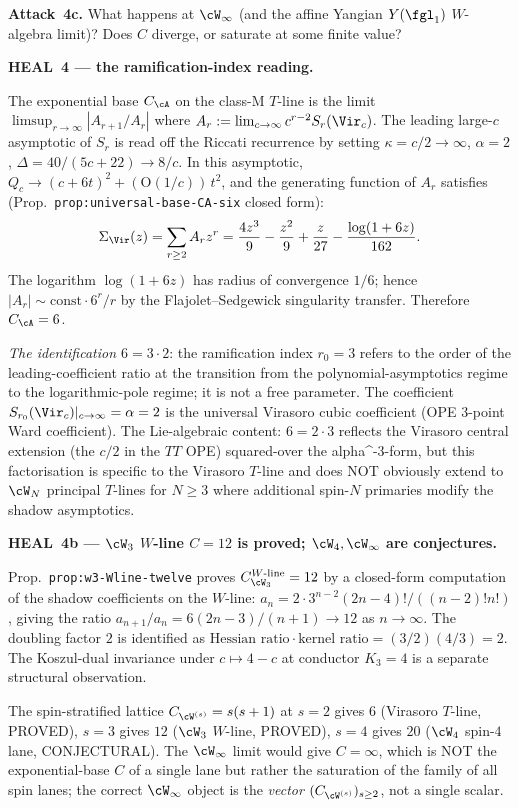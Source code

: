 \textbf{Attack~4c.} What happens at $\cW_\infty$ (and the affine Yangian
$Y(\fgl_1)$ $W$-algebra limit)? Does $C$ diverge, or saturate at some
finite value?

\textbf{HEAL~4 --- the ramification-index reading.}

The exponential base $C_\cA$ on the class-M $T$-line is the limit
$\limsup_{r \to\infty} |A_{r+1}/A_r|$ where
$A_r := \lim_{c \to\infty} c^{r-2} S_r(\Vir_c)$. The leading large-$c$
asymptotic of $S_r$ is read off the Riccati recurrence by setting
$\kappa = c/2 \to \infty$, $\alpha = 2$, $\Delta = 40/(5c+22) \to 8/c$. In
this asymptotic, $Q_c \to (c + 6t)^2 + (\text{O}(1/c))\,t^2$, and the
generating function of $A_r$ satisfies (Prop.~\texttt{prop:universal-base-CA-six}
closed form):
\[
  \Sigma_\Vir(z) = \sum_{r \ge 2} A_r z^r
  = \frac{4z^3}{9} - \frac{z^2}{9} + \frac{z}{27} - \frac{\log(1+6z)}{162}.
\]
The logarithm $\log(1 + 6z)$ has radius of convergence $1/6$; hence
$|A_r| \sim \text{const} \cdot 6^r/r$ by the Flajolet--Sedgewick
singularity transfer. Therefore $C_\cA = 6$.

\emph{The identification $6 = 3 \cdot 2$}: the ramification index $r_0 = 3$
refers to the order of the leading-coefficient ratio at the transition
from the polynomial-asymptotics regime to the logarithmic-pole regime; it
is not a free parameter. The coefficient $S_{r_0}(\Vir_c)|_{c \to\infty}
= \alpha = 2$ is the universal Virasoro cubic coefficient (OPE $3$-point
Ward coefficient). The Lie-algebraic content: $6 = 2 \cdot 3$ reflects the
Virasoro central extension (the $c/2$ in the $TT$ OPE) squared-over the
alpha\^{}-3-form, but this factorisation is specific to the Virasoro
$T$-line and does NOT obviously extend to $\cW_N$ principal $T$-lines for
$N \ge 3$ where additional spin-$N$ primaries modify the shadow asymptotics.

\textbf{HEAL~4b --- $\cW_3$ $W$-line $C = 12$ is proved;
$\cW_4, \cW_\infty$ are conjectures.}

Prop.~\texttt{prop:w3-Wline-twelve} proves $C^{W\text{-line}}_{\cW_3} = 12$
by a closed-form computation of the shadow coefficients on the $W$-line:
$a_n = 2 \cdot 3^{n-2} (2n-4)! / ((n-2)! n!)$, giving the ratio
$a_{n+1}/a_n = 6(2n-3)/(n+1) \to 12$ as $n \to \infty$. The doubling factor
$2$ is identified as $\text{Hessian ratio} \cdot \text{kernel ratio} = (3/2)(4/3) = 2$.
The Koszul-dual invariance under $c \mapsto 4-c$ at conductor $K_3 = 4$ is a
separate structural observation.

The spin-stratified lattice $C_{\cW^{(s)}} = s(s+1)$ at $s = 2$ gives $6$
(Virasoro $T$-line, PROVED), $s = 3$ gives $12$ ($\cW_3$ $W$-line, PROVED),
$s = 4$ gives $20$ ($\cW_4$ spin-$4$ lane, CONJECTURAL). The $\cW_\infty$
limit would give $C = \infty$, which is NOT the
exponential-base $C$ of a single lane but rather the saturation of
the family of all spin lanes; the correct $\cW_\infty$ object is the
\emph{vector} $(C_{\cW^{(s)}})_{s \ge 2}$, not a single scalar.

